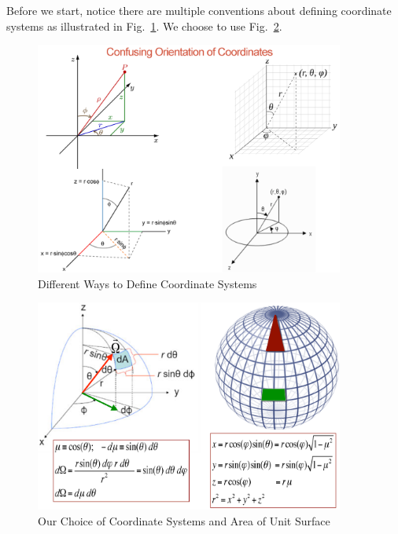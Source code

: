 \documentclass{school-22.211-notes}
\begin{document}
Before we start, notice there are multiple conventions about defining coordinate systems as illustrated in Fig.~\ref{all-coord}. We choose to use Fig.~\ref{coord-1}. 
\begin{figure}[h]
  \centering
  \includegraphics[width=4in]{images/pin/all-coord.png}
  \caption{Different Ways to Define Coordinate Systems} \label{all-coord}
\end{figure}
\begin{figure}[h]
  \centering
  \includegraphics[width=4in]{images/pin/coord-1.png}
  \caption{Our Choice of Coordinate Systems and Area of Unit Surface} \label{coord-1}
\end{figure}
\end{document}
